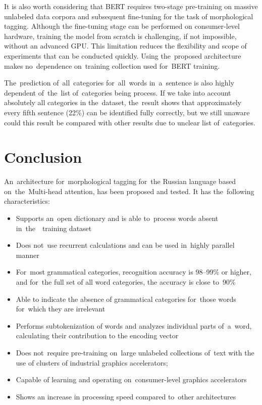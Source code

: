 \documentclass[11pt,twocolumn]{article}
\begin{document}
It is also worth considering that BERT requires two-stage pre-training on massive unlabeled data corpora and subsequent fine-tuning for the task of morphological tagging.
Although the fine-tuning stage can be performed on consumer-level hardware, training the model from scratch is challenging, if not impossible, without an advanced GPU.
This limitation reduces the flexibility and scope of experiments that can be conducted quickly.
Using the~proposed architecture makes no~dependence on~training collection used for~BERT training.

The~prediction of~all~categories for~all~words in~a~sentence is also highly dependent of~the~list of~categories being process.
If we take into account absolutely all categories in the~dataset, the~result shows that approximately every fifth sentence (22\%) can be identified fully correctly,
but we still unaware could this result be compared with other results due to unclear list of~categories.


\section*{Conclusion}

An~architecture for~morphological tagging for~the Russian language based on~the~Multi-head attention,
has been proposed and tested.
It has the~following characteristics: 

\begin{itemize}
\item{
Supports an~open dictionary and is able to~process words absent in~the~~training dataset
}
\item{
Does not~use recurrent calculations and can be used in~highly parallel manner
}
\item{
  For~most grammatical categories, recognition accuracy is 98--99\% or higher,
  and for~the full set of all word categories, the accuracy is close to~90\%
}
\item{
Able to indicate the absence of grammatical categories for~those words for~which they are irrelevant
}
\item{
Performs subtokenization of words and analyzes individual parts of~a~word, calculating their contribution to the encoding vector
}
\item{
Does not~require pre-training on~large unlabeled collections of~text with the use of clusters of industrial graphics accelerators;
}
\item{
Capable of learning and operating on~consumer-level graphics accelerators
}
\item{
Shows an increase in processing speed compared to~other architectures
}
\end{itemize}
\end{document}
